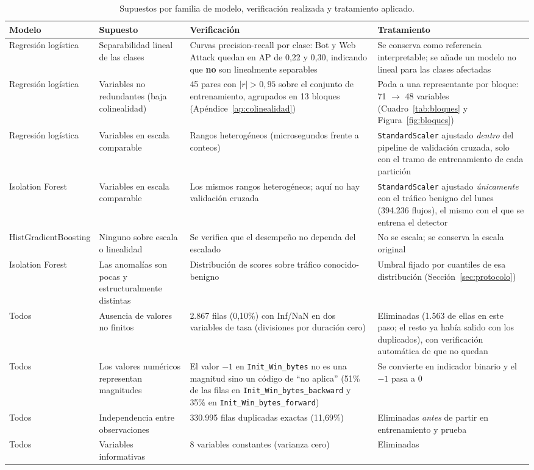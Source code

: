 \documentclass[11pt,a4paper]{article}
\begin{document}
\begin{table}[H]
\centering
\caption{Supuestos por familia de modelo, verificación realizada y tratamiento aplicado.}
\label{tab:supuestos}
\footnotesize\setlength{\tabcolsep}{4pt}
\begin{tabular}{L{2.3cm} L{3.2cm} L{4.5cm} L{4.0cm}}
\toprule
\textbf{Modelo} & \textbf{Supuesto} & \textbf{Verificación} & \textbf{Tratamiento} \\
\midrule
Regresión logística & Separabilidad lineal de las clases &
Curvas precision-recall por clase: Bot y Web Attack quedan en AP de 0,22 y 0,30, indicando que \textbf{no} son linealmente separables &
Se conserva como referencia interpretable; se añade un modelo no lineal para las clases afectadas \\
Regresión logística & Variables no redundantes (baja colinealidad) &
45 pares con $|r| > 0{,}95$ sobre el conjunto de entrenamiento, agrupados en 13 bloques (Apéndice~\ref{ap:colinealidad}) &
Poda a una representante por bloque: 71 $\rightarrow$ 48 variables (Cuadro~\ref{tab:bloques} y Figura~\ref{fig:bloques}) \\
Regresión logística & Variables en escala comparable &
Rangos heterogéneos (microsegundos frente a conteos) &
\texttt{StandardScaler} ajustado \emph{dentro} del pipeline de validación cruzada, solo con el tramo de entrenamiento de cada partición \\
Isolation Forest & Variables en escala comparable &
Los mismos rangos heterogéneos; aquí no hay validación cruzada &
\texttt{StandardScaler} ajustado \emph{únicamente} con el tráfico benigno del lunes (394.236 flujos), el mismo con el que se entrena el detector \\
HistGradient\-Boosting & Ninguno sobre escala o linealidad &
Se verifica que el desempeño no dependa del escalado &
No se escala; se conserva la escala original \\
Isolation Forest & Las anomalías son pocas y estructuralmente distintas &
Distribución de scores sobre tráfico conocido-benigno &
Umbral fijado por cuantiles de esa distribución (Sección~\ref{sec:protocolo}) \\
Todos & Ausencia de valores no finitos &
2.867 filas (0,10\%) con Inf/NaN en dos variables de tasa (divisiones por duración cero) &
Eliminadas (1.563 de ellas en este paso; el resto ya había salido con los duplicados), con verificación automática de que no quedan \\
Todos & Los valores numéricos representan magnitudes &
El valor $-1$ en \texttt{Init\_Win\_bytes} no es una magnitud sino un código de ``no aplica'' (51\% de las filas en \texttt{Init\_Win\_bytes\_backward} y 35\% en \texttt{Init\_Win\_bytes\_forward}) &
Se convierte en indicador binario y el $-1$ pasa a 0 \\
Todos & Independencia entre observaciones &
330.995 filas duplicadas exactas (11,69\%) &
Eliminadas \emph{antes} de partir en entrenamiento y prueba \\
Todos & Variables informativas &
8 variables constantes (varianza cero) &
Eliminadas \\
\bottomrule
\end{tabular}
\end{table}
\end{document}
